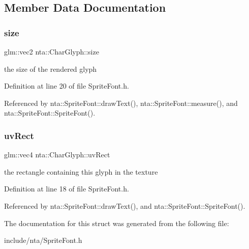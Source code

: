 \subsection{Member Data Documentation}
\mbox{\label{structnta_1_1CharGlyph_aa2a40e6fe48ffadb4c7c95af7e82db91}} 
\subsubsection{\texorpdfstring{size}{size}}
{\footnotesize\ttfamily glm\+::vec2 nta\+::\+Char\+Glyph\+::size}



the size of the rendered glyph 



Definition at line 20 of file Sprite\+Font.\+h.



Referenced by nta\+::\+Sprite\+Font\+::draw\+Text(), nta\+::\+Sprite\+Font\+::measure(), and nta\+::\+Sprite\+Font\+::\+Sprite\+Font().

\mbox{\label{structnta_1_1CharGlyph_a46d9ea9c38c8bf5e1c1679e938019f53}} 
\subsubsection{\texorpdfstring{uv\+Rect}{uvRect}}
{\footnotesize\ttfamily glm\+::vec4 nta\+::\+Char\+Glyph\+::uv\+Rect}



the rectangle containing this glyph in the texture 



Definition at line 18 of file Sprite\+Font.\+h.



Referenced by nta\+::\+Sprite\+Font\+::draw\+Text(), and nta\+::\+Sprite\+Font\+::\+Sprite\+Font().



The documentation for this struct was generated from the following file\+:\begin{DoxyCompactItemize}
\item 
include/nta/Sprite\+Font.\+h\end{DoxyCompactItemize}
